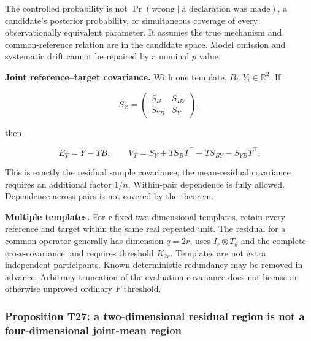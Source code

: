 \documentclass[11pt,a4paper]{article}
\begin{document}
The controlled probability is not
\(\Pr(\text{wrong}\mid\text{a declaration was made})\), a candidate's
posterior probability, or simultaneous coverage of every observationally
equivalent parameter. It assumes the true mechanism and common-reference
relation are in the candidate space. Model omission and systematic drift
cannot be repaired by a nominal \(p\) value.

\par
\noindent\begin{minipage}{\linewidth}

\textbf{Joint reference–target covariance.} With one template,
\(B_i,Y_i\in\mathbb R^2\). If

\[
S_Z=\begin{pmatrix}S_B&S_{BY}\\S_{YB}&S_Y\end{pmatrix},
\]

\end{minipage}\par

\par
\noindent\begin{minipage}{\linewidth}

then

\[
\bar E_T=\bar Y-T\bar B,\qquad
V_T=S_Y+TS_BT^\top-TS_{BY}-S_{YB}T^\top.
\]

\end{minipage}\par

This is exactly the residual sample covariance; the mean-residual
covariance requires an additional factor \(1/n\). Within-pair dependence
is fully allowed. Dependence across pairs is not covered by the theorem.

\textbf{Multiple templates.} For \(r\) fixed two-dimensional templates,
retain every reference and target within the same real repeated unit.
The residual for a common operator generally has dimension \(q=2r\),
uses \(I_r\otimes T_\theta\) and the complete cross-covariance, and
requires threshold \(K_{2r}\). Templates are not extra independent
participants. Known deterministic redundancy may be removed in advance.
Arbitrary truncation of the evaluation covariance does not license an
otherwise unproved ordinary \(F\) threshold.

\subsubsection{Proposition T27: a two-dimensional residual region is not
a four-dimensional joint-mean
region}\label{proposition-t27-a-two-dimensional-residual-region-is-not-a-four-dimensional-joint-mean-region}
\end{document}
